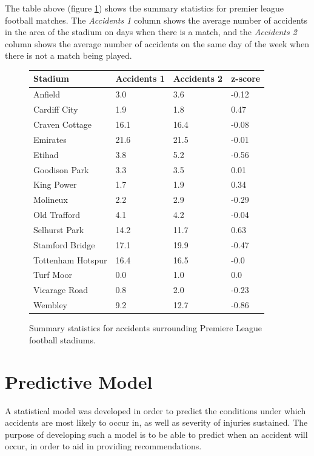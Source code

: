\documentclass[12pt]{article}
\begin{document}
The table above (figure \ref{football}) shows the summary statistics for premier league football matches. The \textit{Accidents 1} column shows the average number of accidents in the area of the stadium on days when there is a match, and the \textit{Accidents 2} column shows the average number of accidents on the same day of the week when there is not a match being played.


\begin{figure}
    \centering
    \begin{tabular}{|l|l|l|l|}
    \hline
        Stadium & Accidents 1 & Accidents 2 & z-score \\ \hline
        Anfield & 3.0 & 3.6 & -0.12 \\ \hline
        Cardiff City & 1.9 & 1.8 & 0.47 \\ \hline
        Craven Cottage & 16.1 & 16.4 & -0.08 \\ \hline
        Emirates & 21.6 & 21.5 & -0.01 \\ \hline
        Etihad & 3.8 & 5.2 & -0.56 \\ \hline
        Goodison Park & 3.3 & 3.5 & 0.01 \\ \hline
        King Power & 1.7 & 1.9 & 0.34 \\ \hline
        Molineux & 2.2 & 2.9 & -0.29 \\ \hline
        Old Trafford & 4.1 & 4.2 & -0.04 \\ \hline
        Selhurst Park & 14.2 & 11.7 & 0.63 \\ \hline
        Stamford Bridge & 17.1 & 19.9 & -0.47 \\ \hline
        Tottenham Hotspur & 16.4 & 16.5 & -0.0 \\ \hline
        Turf Moor & 0.0 & 1.0 & 0.0 \\ \hline
        Vicarage Road & 0.8 & 2.0 & -0.23 \\ \hline
        Wembley & 9.2 & 12.7 & -0.86 \\ \hline
    \end{tabular}
    \caption{Summary statistics for accidents surrounding Premiere League football stadiums.}
    \label{football}
\end{figure}


\section{Predictive Model}


A statistical model was developed in order to predict the conditions under which accidents are most likely to occur in, as well as severity of injuries sustained.
The purpose of developing such a model is to be able to predict when an accident will occur, in order to aid in providing recommendations.
\end{document}
